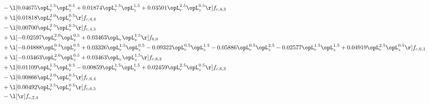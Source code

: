 \begin{alignat}{2}
& - \l[  0.04675 \opL_r^{1.5} \opL_z^{0.5} +  0.01874 \opL_r^{1.5} \opL_z^{1.5} +  0.03501 \opL_r^{2.5} \opL_z^{0.5}  \r] f_{c,4,3} \nonumber \\ 
& + \l[  0.01818 \opL_r^{2.0} \opL_z^{0.5}  \r] f_{c,4,4} \nonumber \\ 
& - \l[  0.00700 \opL_r^{2.5} \opL_z^{0.5}  \r] f_{c,4,5} \nonumber \\ 
& + \l[  -0.02597 \opL_r^{2.0} \opL_z^{0.5} +  0.03463 \opL_r \opL_z^{1.5}  \r] f_{6,0} \nonumber \\ 
& + \l[  -0.04888 \opL_r^{0.5} \opL_z^{0.5} +  0.03326 \opL_r^{1.5} \opL_z^{0.5}   -0.09322 \opL_r^{0.5} \opL_z^{1.5}   -0.05886 \opL_r^{0.5} \opL_z^{2.5}   -0.02577 \opL_r^{1.5} \opL_z^{1.5} +  0.04919 \opL_r^{2.5} \opL_z^{0.5}  \r] f_{c,6,1} \nonumber \\ 
& + \l[  -0.03463 \opL_r^{2.0} \opL_z^{0.5} +  0.03463 \opL_r \opL_z^{1.5}  \r] f_{c,6,2} \nonumber \\ 
& + \l[  0.01109 \opL_r^{1.5} \opL_z^{0.5}   -0.00859 \opL_r^{1.5} \opL_z^{1.5} +  0.02459 \opL_r^{2.5} \opL_z^{0.5}  \r] f_{c,6,3} \nonumber \\ 
& - \l[  0.00866 \opL_r^{2.0} \opL_z^{0.5}  \r] f_{c,6,4} \nonumber \\ 
& + \l[  0.00492 \opL_r^{2.5} \opL_z^{0.5}  \r] f_{c,6,5} \nonumber \\ 
& - \l[  \r] f_{c,2,4} \nonumber \\ 
\end{alignat} 


